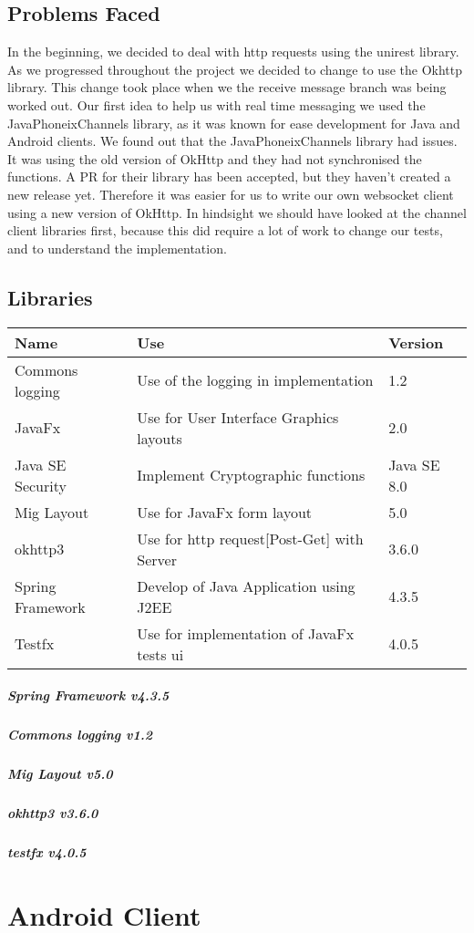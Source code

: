 \documentclass[11pt,a4paper]{report}
\begin{document}
\subsection{Problems Faced}
In the beginning, we decided to deal with http requests using the unirest library. As we progressed throughout the project we decided to change to use the Okhttp library. This change took place when we the receive message branch was being worked out. Our first idea to help us with real time messaging we used the JavaPhoneixChannels library, as it was known for ease development for Java and Android clients. We found out that the JavaPhoneixChannels library had issues. It was using the old version of OkHttp and they had not synchronised the functions. A PR for their library has been accepted, but they haven’t created a new release yet. Therefore it was easier for us to write our own websocket client using a new version of OkHttp. In hindsight we should have looked at the channel client libraries first, because this did require a lot of work to change our tests, and to understand the implementation.

\subsection{Libraries}

\begin{tabular}{| l | l | l |}
  \hline
  Name & Use & Version \\
  \hline
  Commons logging & Use of the logging in implementation & 1.2\\
  JavaFx & Use for User Interface Graphics layouts & 2.0\\
  Java SE Security & Implement Cryptographic functions & Java SE 8.0\\
  Mig Layout & Use for JavaFx form layout & 5.0\\
  okhttp3 & Use for http request[Post-Get] with Server  & 3.6.0\\
  Spring Framework & Develop of Java Application using J2EE & 4.3.5\\
  Testfx & Use for implementation of JavaFx tests ui  & 4.0.5\\
  \hline
\end{tabular}

\subparagraph{Spring Framework v4.3.5}
\subparagraph{Commons logging v1.2}
\subparagraph{Mig Layout v5.0}
\subparagraph{okhttp3 v3.6.0}
\subparagraph{testfx v4.0.5}

\section{Android Client}
\end{document}
